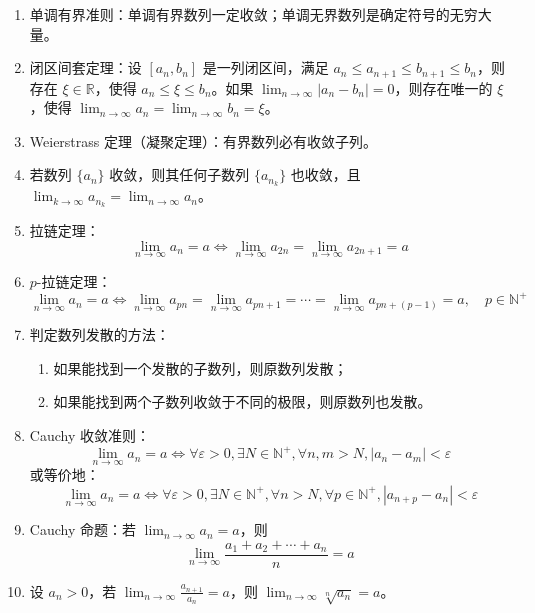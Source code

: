 \documentclass[UTF8]{ctexart}
\theoremstyle{remark}
\begin{document}
\begin{enumerate}
			\item 单调有界准则：单调有界数列一定收敛；单调无界数列是确定符号的无穷大量。
			
			\item 闭区间套定理：设 $ [a_n, b_n] $ 是一列闭区间，满足 $ a_n \leq a_{n+1} \leq b_{n+1} \leq b_n $，则存在 $ \xi \in \mathbb{R} $，使得 $ a_n \leq \xi \leq b_n $。如果 $ \lim_{n \to \infty} |a_n - b_n| = 0 $，则存在唯一的 $ \xi $，使得 $ \lim_{n \to \infty} a_n = \lim_{n \to \infty} b_n = \xi $。
			
			\item Weierstrass 定理（凝聚定理）：有界数列必有收敛子列。
			
			\item 若数列 $ \{a_n\} $ 收敛，则其任何子数列 $ \{a_{n_k}\} $ 也收敛，且 $ \lim_{k \to \infty} a_{n_k} = \lim_{n \to \infty} a_n $。
			
			\item 拉链定理：$$
			\lim_{n \to \infty} a_n = a \iff \lim_{n \to \infty} a_{2n} = \lim_{n \to \infty} a_{2n+1} = a
			$$
			
			\item $ p $-拉链定理：$$
			\lim_{n \to \infty} a_n = a \iff \lim_{n \to \infty} a_{pn} = \lim_{n \to \infty} a_{pn+1} = \cdots = \lim_{n \to \infty} a_{pn+(p-1)} = a,\quad p \in \mathbb{N}^+
			$$
			
			\item 判定数列发散的方法：
			\begin{enumerate}
				\item 如果能找到一个发散的子数列，则原数列发散；
				\item 如果能找到两个子数列收敛于不同的极限，则原数列也发散。
			\end{enumerate}
			
			\item Cauchy 收敛准则：
			$$
			\lim_{n \to \infty} a_n = a \iff \forall \varepsilon > 0, \exists N \in \mathbb{N}^+, \forall n, m > N, |a_n - a_m| < \varepsilon
			$$
			或等价地：
			$$
			\lim_{n \to \infty} a_n = a \iff \forall \varepsilon > 0, \exists N \in \mathbb{N}^+, \forall n > N, \forall p \in \mathbb{N}^+, |a_{n+p} - a_n| < \varepsilon
			$$
			
			\item Cauchy 命题：若 $ \lim_{n \to \infty} a_n = a $，则
			$$
			\lim_{n \to \infty} \frac{a_1 + a_2 + \cdots + a_n}{n} = a
			$$
			
			\item 设 $ a_n > 0 $，若 $ \lim_{n \to \infty} \frac{a_{n+1}}{a_n} = a $，则 $ \lim_{n \to \infty} \sqrt[n]{a_n} = a $。
			

\end{enumerate}
\end{document}
